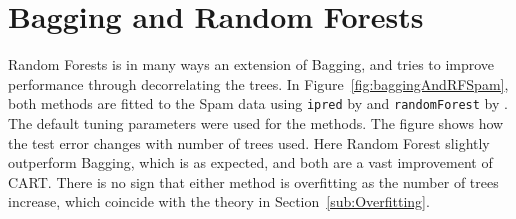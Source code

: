 \section{Bagging and Random Forests}
\label{sec:BaggandRFSim}
Random Forests is in many ways an extension of Bagging, and tries to improve performance through decorrelating the trees. In Figure~\ref{fig:baggingAndRFSpam}, both methods are fitted to the Spam data using \verb+ipred+ by \cite{ipred} and \verb+randomForest+ by \cite{randomForestR}. The default tuning parameters were used for the methods. The figure shows how the test error changes with number of trees used. Here Random Forest slightly outperform Bagging, which is as expected, and both are a vast improvement of CART. There is no sign that either method is overfitting as the number of trees increase, which coincide with the theory in Section~\ref{sub:Overfitting}.
\\
